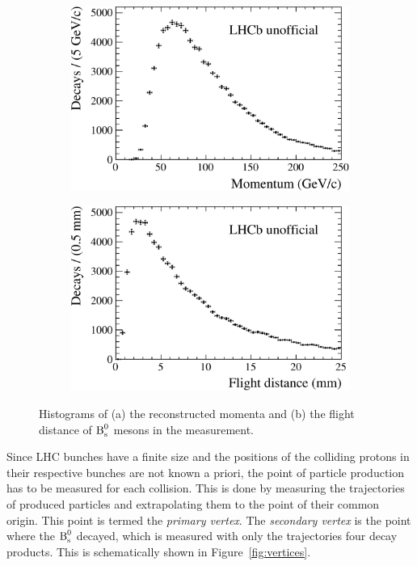 \begin{figure}[tb]
  \centering
  \begin{subfigure}{0.49\textwidth}
    \includegraphics[width=\textwidth]{graphics/intro/BMomentum}
    \caption{}
    \label{fig:introHists_BMomentum}
  \end{subfigure}%
  \hfill%
  \begin{subfigure}{0.49\textwidth}
    \includegraphics[width=\textwidth]{graphics/intro/flightDist}
    \caption{}
    \label{fig:introHists_flightDist}
  \end{subfigure}
  \caption{Histograms of (a) the reconstructed momenta and (b) the flight distance of $\text{B}_\text{s}^\text{0}$ mesons in the \BstoJpsiKK{} measurement.}
  \label{fig:introHists}
\end{figure}

Since LHC bunches have a finite size and the positions of the colliding protons in their respective bunches are not known a priori, the
point of particle production has to be measured for each collision. This is done by measuring the trajectories of produced particles and
extrapolating them to the point of their common origin. This point is termed the \emph{primary vertex}. The \emph{secondary vertex} is the
point where the $\text{B}_\text{s}^\text{0}$ decayed, which is measured with only the trajectories four decay products. This is schematically shown in
Figure~\ref{fig:vertices}.

